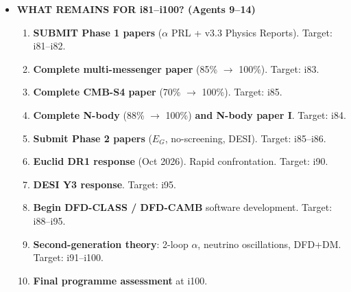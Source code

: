 \documentclass[11pt,a4paper]{article}
\begin{document}
\begin{itemize}
\begin{tcolorbox}[colback=green!5!white, colframe=dfdgreen, title=\textbf{i52--i80 Achievement Summary}]
\begin{enumerate}[nosep]
\item \textbf{Findings}: 100 (i52) $\to$ 180 (i80). \textbf{+80 findings documented}.

\item \textbf{Paper Proposals}: 520 (i52) $\to$ 1972 (i80). \textbf{+1452 proposals}.

\item \textbf{Corrections}: 60 (i52) $\to$ 87 (i80). \textbf{+27 corrections} (all minor; 0 retracted results since i52).

\item \textbf{Adversarial Audits}: 3 comprehensive audits (i66, i75, i78). All 97 GREEN items verified. 0 errors found.

\item \textbf{DESI Confrontation}: DESI Y1 and Y2 data consistent with DFD at $< 0.3\sigma$. Y3 predictions pre-registered.

\item \textbf{Publication Strategy}: 4-phase plan developed. Conference targets identified. Collaboration network initiated.
\end{enumerate}
\end{tcolorbox}

\item \textbf{WHAT REMAINS FOR i81--i100? (Agents 9--14)}

\begin{tcolorbox}[colback=blue!5!white, colframe=dfdblue, title=\textbf{i81--i100 Priorities}]
\begin{enumerate}[nosep]
\item \textbf{SUBMIT Phase 1 papers} ($\alpha$ PRL + v3.3 Physics Reports). Target: i81--i82.
\item \textbf{Complete multi-messenger paper} (85\% $\to$ 100\%). Target: i83.
\item \textbf{Complete CMB-S4 paper} (70\% $\to$ 100\%). Target: i85.
\item \textbf{Complete N-body} (88\% $\to$ 100\%) \textbf{and N-body paper I}. Target: i84.
\item \textbf{Submit Phase 2 papers} ($E_G$, no-screening, DESI). Target: i85--i86.
\item \textbf{Euclid DR1 response} (Oct 2026). Rapid confrontation. Target: i90.
\item \textbf{DESI Y3 response}. Target: i95.
\item \textbf{Begin DFD-CLASS / DFD-CAMB} software development. Target: i88--i95.
\item \textbf{Second-generation theory}: 2-loop $\alpha$, neutrino oscillations, DFD+DM. Target: i91--i100.
\item \textbf{Final programme assessment} at i100.
\end{enumerate}
\end{tcolorbox}


\end{itemize}
\end{document}
